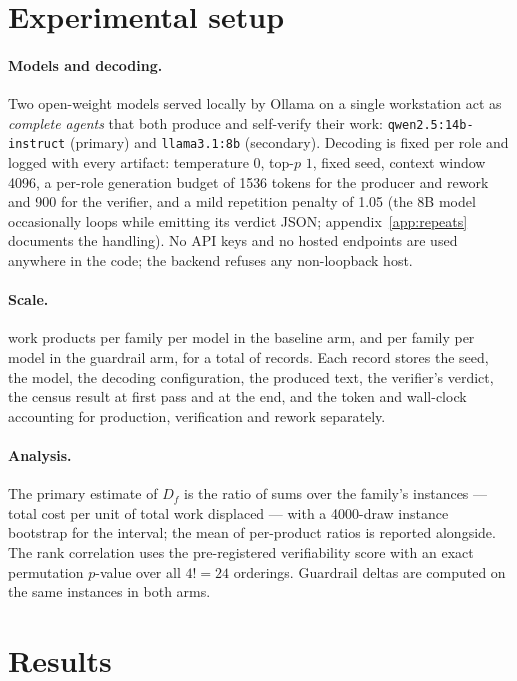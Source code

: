 \documentclass[11pt]{article}
\newcommand{\D}{\ensuremath{D}}
\begin{document}
\section{Experimental setup}
\label{sec:setup}

\paragraph{Models and decoding.} Two open-weight models served locally by Ollama on a single
workstation act as \emph{complete agents} that both produce and self-verify their work:
\texttt{qwen2.5:14b-instruct} (primary) and \texttt{llama3.1:8b} (secondary). Decoding is fixed per
role and logged with every artifact: temperature $0$, top-$p$ $1$, fixed seed, context window
4096, a per-role generation budget of 1536 tokens for the producer and rework and 900 for the verifier, and a
mild repetition penalty of 1.05 (the 8B model occasionally loops while emitting its verdict JSON;
appendix~\ref{app:repeats} documents the handling). No API keys and no hosted endpoints are used
anywhere in the code; the backend refuses any non-loopback host.

\paragraph{Scale.} \VDnBase{} work products per family per model in the baseline arm, and
\VDnGuard{} per family per model in the guardrail arm, for a total of \VDnumRecords{} records. Each
record stores the seed, the model, the decoding configuration, the produced text, the verifier's
verdict, the census result at first pass and at the end, and the token and wall-clock accounting
for production, verification and rework separately.

\paragraph{Analysis.} The primary estimate of $\D_f$ is the ratio of sums over the family's
instances --- total cost per unit of total work displaced --- with a 4000-draw instance bootstrap
for the interval; the mean of per-product ratios is reported alongside. The rank correlation uses
the pre-registered verifiability score with an exact permutation $p$-value over all $4!=24$
orderings. Guardrail deltas are computed on the same instances in both arms.

\section{Results}
\label{sec:results}
\end{document}
